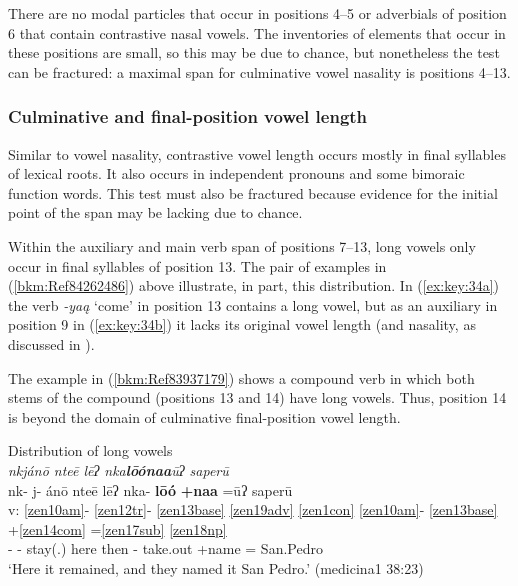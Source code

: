 \documentclass[output=paper]{langscibook}
\begin{document}
\label{bkm:Ref113308229}

There are no modal particles that occur in positions 4--5 or adverbials of position 6 that contain contrastive nasal vowels. The inventories of elements that occur in these positions are small, so this may be due to chance, but nonetheless the test can be fractured: a maximal span for culminative vowel nasality is positions 4{}--13.

\subsubsection{Culminative and final-position vowel length} 
\label{bkm:Ref15745289}
Similar to vowel nasality, contrastive vowel length occurs mostly in final syllables of lexical roots. It also occurs in independent pronouns and some bimoraic function words. This test must also be fractured because evidence for the initial point of the span may be lacking due to chance.

\label{bkm:Ref113308246}
Within the auxiliary and main verb span of positions 7{}--13, long vowels only occur in final syllables of position 13. The pair of examples in (\ref{bkm:Ref84262486}) above illustrate, in part, this distribution. In (\ref{ex:key:34a}) the verb \textit{\nobreakdash-yaą} `come' in position 13 contains a long vowel, but as an auxiliary in position 9 in (\ref{ex:key:34b}) it lacks its original vowel length (and nasality, as discussed in ).

The example in (\ref{bkm:Ref83937179}) shows a compound verb in which both stems of the compound (positions 13 and 14) have long vowels. Thus, position 14 is beyond the domain of culminative final-position vowel length.


\ea\label{bkm:Ref83937179}Distribution of long vowels\\
\textit{nkjánō nteē lēʔ nka\textbf{lōónaa}ūʔ saperū}\\
\glll {} nk- j- ánō nteē lēʔ nka- \textbf{lōó} \textbf{+naa} =ūʔ saperū\\
v: \ref{zen10am}{}- \ref{zen12tr}{}- \ref{zen13base} \ref{zen19adv} \ref{zen1con} \ref{zen10am}{}- \ref{zen13base} +\ref{zen14com} =\ref{zen17sub} \ref{zen18np}\\ 
{} \Pfv{}- \Itr{}- stay(.\Third{}) here then \Pfv{}- take.out +name =\Third\Pl{} San.Pedro\\
\glt `Here it remained, and they named it San Pedro.' (medicina1 38:23)
\z
\end{document}

